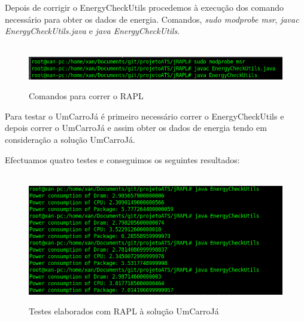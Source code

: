 Depois de corrigir o EnergyCheckUtils procedemos à execução dos comando necessário para obter os dados de energia. Comandos, \textit{sudo modprobe msr}, \textit{javac EnergyCheckUtils.java} e \textit{java EnergyCheckUtils}.

\begin{figure}[H]
    \hbox{\hspace{-8em} \includegraphics[width=1.5\textwidth]{images/rapl_run.png}}
    \label{fig50}
    \caption{Comandos para correr o RAPL}
\end{figure}

Para testar o UmCarroJá é primeiro necessário correr o EnergyCheckUtils e depois correr o UmCarroJá e assim obter os dados de energia tendo em consideração a solução UmCarroJá.

Efectuamos quatro testes e conseguimos os seguintes resultados:

\begin{figure}[H]
    \hbox{\hspace{-8em} \includegraphics[width=1.5\textwidth]{images/rapl_run_tests.png}}
    \label{fig50}
    \caption{Testes elaborados com RAPL à solução UmCarroJá}
\end{figure}


